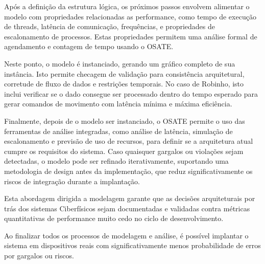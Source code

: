 Após a definição da estrutura lógica, os próximos passos envolvem alimentar o modelo com propriedades relacionadas as performance, como tempo de execução de threads, latência de comunicação, frequências, e propriedades de escalonamento de processos. Estas propriedades permitem uma análise formal de agendamento e contagem de tempo usando o OSATE.

Neste ponto, o modelo é instanciado, gerando um gráfico completo de sua instância. Isto permite checagem de validação para consistência arquitetural, corretude de fluxo de dados e restrições temporais. No caso de Robinho, isto inclui verificar se o dado consegue ser processado dentro do tempo esperado para gerar comandos de movimento com latência mínima e máxima eficiência.

Finalmente, depois de o modelo ser instanciado, o OSATE permite o uso das ferramentas de análise integradas, como análise de latência, simulação de escalonamento e previsão de uso de recursos, para definir se a arquitetura atual cumpre os requisitos do sistema. Caso quaisquer gargalos ou violações sejam detectadas, o modelo pode ser refinado iterativamente, suportando uma metodologia de design antes da implementação, que reduz significativamente os riscos de integração durante a implantação.

Esta abordagem dirigida a modelagem garante que as decisões arquiteturais por trás dos sistemas Ciberfísicos sejam documentadas e validadas contra métricas quantitativas de performance muito cedo no ciclo de desenvolvimento.

Ao finalizar todos os processos de modelagem e análise, é possível implantar o sistema em dispositivos reais com significativamente menos probabilidade de erros por gargalos ou riscos.
